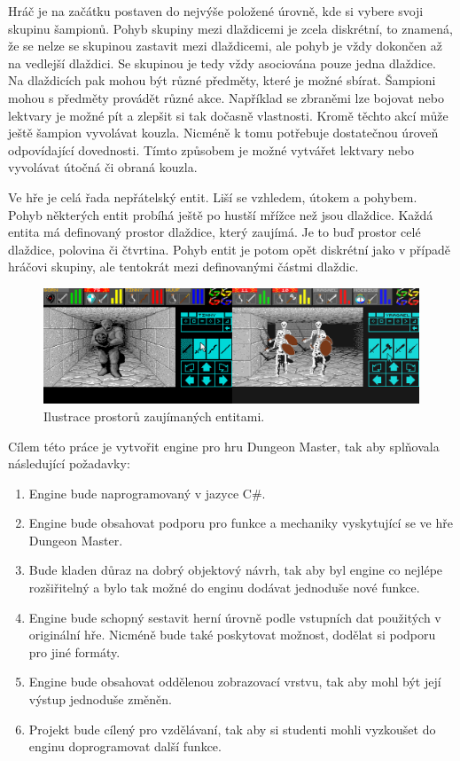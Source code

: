 Hráč je na začátku postaven do nejvýše položené úrovně, kde si vybere svoji skupinu šampionů. 
Pohyb skupiny mezi dlaždicemi je zcela diskrétní, to znamená, že se nelze se skupinou zastavit mezi dlaždicemi, ale pohyb je vždy dokončen
až na vedlejší dlaždici. Se skupinou je tedy vždy asociována pouze jedna dlaždice. Na dlaždicích pak mohou
být různé předměty, které je možné sbírat. Šampioni mohou s předměty provádět různé akce.
Například se zbraněmi lze bojovat nebo lektvary je možné pít a zlepšit si tak dočasně vlastnosti. Kromě těchto 
akcí může ještě šampion vyvolávat kouzla. Nicméně k tomu potřebuje dostatečnou úroveň odpovídající dovednosti.
Tímto způsobem je možné vytvářet lektvary nebo vyvolávat útočná či obraná kouzla.

Ve hře je celá řada nepřátelský entit. Liší se vzhledem, útokem a pohybem. Pohyb některých entit 
probíhá ještě po hustší mřížce než jsou dlaždice. Každá entita má definovaný prostor dlaždice, který zaujímá. Je to buď prostor
celé dlaždice, polovina či čtvrtina.  Pohyb entit je potom opět diskrétní jako v případě hráčovi skupiny, 
ale tentokrát mezi definovanými částmi dlaždic. 

\begin{figure}[H]\centering
\includegraphics[width=\textwidth]{./img/DM-group-example.png}
\caption{Ilustrace prostorů zaujímaných entitami.}
\label{obr2:uvod}
\end{figure}

Cílem této práce je vytvořit engine pro hru Dungeon Master, tak aby splňovala následující požadavky:
\begin{enumerate}
\item Engine bude naprogramovaný v jazyce C\#.
\item\label{aim-mechanics} Engine bude obsahovat podporu pro funkce a mechaniky vyskytující se ve hře Dungeon Master.
\item\label{aim-extensibility} Bude kladen důraz na dobrý objektový návrh, tak aby byl engine co nejlépe rozšiřitelný a bylo 
	tak možné do enginu dodávat jednoduše nové funkce.
\item\label{aim-builders} Engine bude schopný sestavit herní úrovně podle vstupních dat použitých v originální hře. Nicméně
	bude také poskytovat možnost, dodělat si podporu pro jiné formáty.
\item\label{aim-rendering} Engine bude obsahovat oddělenou zobrazovací vrstvu, tak aby mohl být její výstup jednoduše změněn.
\item Projekt bude cílený pro vzdělávaní, tak aby si studenti mohli vyzkoušet do enginu doprogramovat další funkce.
\end{enumerate}

